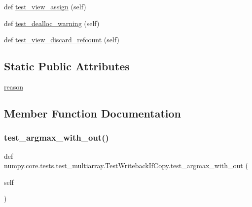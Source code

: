 \begin{DoxyCompactItemize}
\item 
def \hyperlink{classnumpy_1_1core_1_1tests_1_1test__multiarray_1_1TestWritebackIfCopy_a090037125f40d5f8a4ac8c09349df167}{test\+\_\+view\+\_\+assign} (self)
\item 
def \hyperlink{classnumpy_1_1core_1_1tests_1_1test__multiarray_1_1TestWritebackIfCopy_a572945d3c10965c9b9fd40bc81e11cc1}{test\+\_\+dealloc\+\_\+warning} (self)
\item 
def \hyperlink{classnumpy_1_1core_1_1tests_1_1test__multiarray_1_1TestWritebackIfCopy_adbe0ce8a904a0b61f5ecb47931444730}{test\+\_\+view\+\_\+discard\+\_\+refcount} (self)
\end{DoxyCompactItemize}
\subsection*{Static Public Attributes}
\begin{DoxyCompactItemize}
\item 
\hyperlink{classnumpy_1_1core_1_1tests_1_1test__multiarray_1_1TestWritebackIfCopy_ae4e33702d622c6a5316146dc77c6b3dd}{reason}
\end{DoxyCompactItemize}


\subsection{Member Function Documentation}
\mbox{\label{classnumpy_1_1core_1_1tests_1_1test__multiarray_1_1TestWritebackIfCopy_adf64dce2d0f074db7cec81e4cb71d824}} 
\subsubsection{\texorpdfstring{test\+\_\+argmax\+\_\+with\+\_\+out()}{test\_argmax\_with\_out()}}
{\footnotesize\ttfamily def numpy.\+core.\+tests.\+test\+\_\+multiarray.\+Test\+Writeback\+If\+Copy.\+test\+\_\+argmax\+\_\+with\+\_\+out (\begin{DoxyParamCaption}\item[{}]{self }\end{DoxyParamCaption})}

